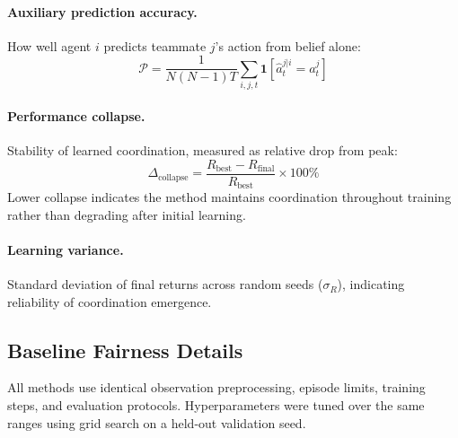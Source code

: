 \documentclass{article}
\theoremstyle{plain}
\theoremstyle{definition}
\theoremstyle{remark}
\begin{document}
\paragraph{Auxiliary prediction accuracy.} How well agent $i$ predicts teammate $j$'s action from belief alone:
\begin{equation}
\mathcal{P} = \frac{1}{N(N-1)T}\sum_{i,j,t} \mathbf{1}[\hat{a}_{t}^{j|i} = a_t^j]
\end{equation}

\paragraph{Performance collapse.} Stability of learned coordination, measured as relative drop from peak:
\begin{equation}
\Delta_{\mathrm{collapse}} = \frac{R_{\mathrm{best}} - R_{\mathrm{final}}}{R_{\mathrm{best}}} \times 100\%
\end{equation}
Lower collapse indicates the method maintains coordination throughout training rather than degrading after initial learning.

\paragraph{Learning variance.} Standard deviation of final returns across random seeds ($\sigma_R$), indicating reliability of coordination emergence.

\subsection{Baseline Fairness Details}
\label{app:baseline_fairness}

All methods use identical observation preprocessing, episode limits, training steps, and evaluation protocols. Hyperparameters were tuned over the same ranges using grid search on a held-out validation seed.
\end{document}

